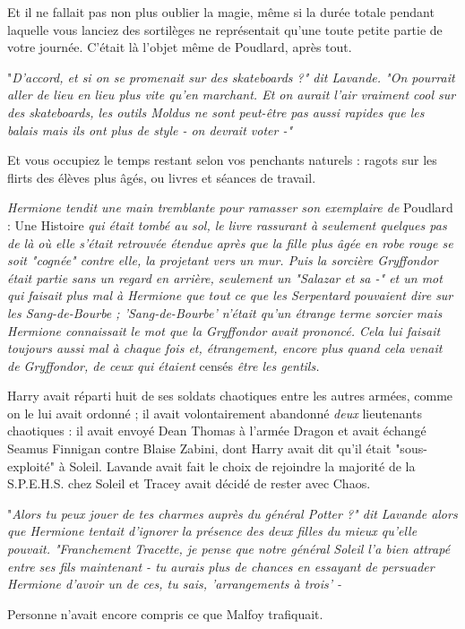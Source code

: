Et il ne fallait pas non plus oublier la magie, même si la durée totale pendant laquelle vous lanciez des sortilèges ne représentait qu'une toute petite partie de votre journée. C'était là l'objet même de Poudlard, après tout.

"\emph{D'accord, et si on se promenait sur des skateboards ?" dit Lavande. "On pourrait aller de lieu en lieu plus vite qu'en marchant. Et on aurait l'air vraiment cool sur des skateboards, les outils Moldus ne sont peut-être pas aussi rapides que les balais mais ils ont plus de style - on devrait voter -"} 

Et vous occupiez le temps restant selon vos penchants naturels : ragots sur les flirts des élèves plus âgés, ou livres et séances de travail.

\emph{Hermione tendit une main tremblante pour ramasser son exemplaire de } Poudlard : Une Histoire\emph{ qui était tombé au sol, le livre rassurant à seulement quelques pas de là où elle s'était retrouvée étendue après que la fille plus âgée en robe rouge se soit "cognée" contre elle, la projetant vers un mur. Puis la sorcière Gryffondor était partie sans un regard en arrière, seulement un "Salazar et sa -" et un mot qui faisait plus mal à Hermione que tout ce que les Serpentard pouvaient dire sur les Sang-de-Bourbe ; 'Sang-de-Bourbe' n'était qu'un étrange terme sorcier mais Hermione connaissait le mot que la Gryffondor avait prononcé. Cela lui faisait toujours aussi mal à chaque fois et, étrangement, encore plus quand cela venait de Gryffondor, de ceux qui étaient } censés \emph{être les gentils.} 

Harry avait réparti huit de ses soldats chaotiques entre les autres armées, comme on le lui avait ordonné ; il avait volontairement abandonné \emph{deux}  lieutenants chaotiques : il avait envoyé Dean Thomas à l'armée Dragon et avait échangé Seamus Finnigan contre Blaise Zabini, dont Harry avait dit qu'il était "sous-exploité" à Soleil. Lavande avait fait le choix de rejoindre la majorité de la S.P.E.H.S. chez Soleil et Tracey avait décidé de rester avec Chaos.

"\emph{Alors tu peux jouer de tes charmes auprès du général Potter ?" dit Lavande alors que Hermione tentait d'ignorer la présence des deux filles du mieux qu'elle pouvait. "Franchement Tracette, je pense que notre général Soleil l'a bien attrapé entre ses fils maintenant - tu aurais plus de chances en essayant de persuader Hermione d'avoir un de ces, tu sais, 'arrangements à trois' -} 

Personne n'avait encore compris ce que Malfoy trafiquait.

